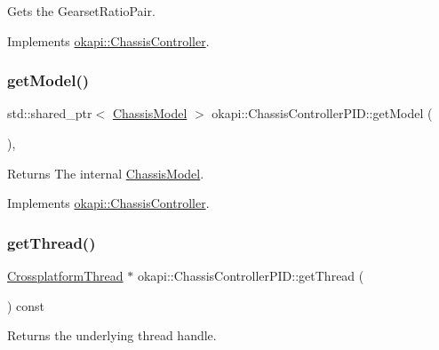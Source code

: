 Gets the Gearset\+Ratio\+Pair. 

Implements \mbox{\hyperlink{classokapi_1_1ChassisController_aa19351888b997d4a6596dac24520ebff}{okapi\+::\+Chassis\+Controller}}.

\mbox{\label{classokapi_1_1ChassisControllerPID_adffe6c9a65b6bd7664e0a884638d9097}} 
\subsubsection{\texorpdfstring{getModel()}{getModel()}}
{\footnotesize\ttfamily std\+::shared\+\_\+ptr$<$ \mbox{\hyperlink{classokapi_1_1ChassisModel}{Chassis\+Model}} $>$ okapi\+::\+Chassis\+Controller\+P\+I\+D\+::get\+Model (\begin{DoxyParamCaption}{ }\end{DoxyParamCaption})\hspace{0.3cm}{\ttfamily [override]}, {\ttfamily [virtual]}}

\begin{DoxyReturn}{Returns}
The internal \mbox{\hyperlink{classokapi_1_1ChassisModel}{Chassis\+Model}}. 
\end{DoxyReturn}


Implements \mbox{\hyperlink{classokapi_1_1ChassisController_a1971d4b54b61718437824c026aca53c9}{okapi\+::\+Chassis\+Controller}}.

\mbox{\label{classokapi_1_1ChassisControllerPID_a1f46569d95876a690e99048e0fd9935e}} 
\subsubsection{\texorpdfstring{getThread()}{getThread()}}
{\footnotesize\ttfamily \mbox{\hyperlink{classCrossplatformThread}{Crossplatform\+Thread}} $\ast$ okapi\+::\+Chassis\+Controller\+P\+I\+D\+::get\+Thread (\begin{DoxyParamCaption}{ }\end{DoxyParamCaption}) const}

Returns the underlying thread handle.

